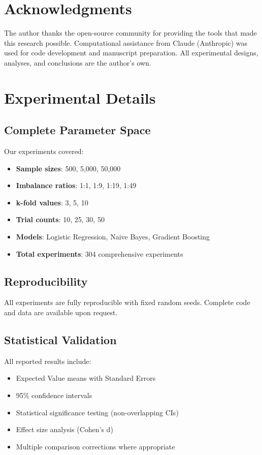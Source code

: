 \documentclass[twoside,11pt]{article}
\begin{document}
\section*{Acknowledgments}

The author thanks the open-source community for providing the tools that made this research possible. Computational assistance from Claude (Anthropic) was used for code development and manuscript preparation. All experimental designs, analyses, and conclusions are the author's own.




\appendix

\section{Experimental Details}

\subsection{Complete Parameter Space}
Our experiments covered:
\begin{itemize}
    \item \textbf{Sample sizes}: 500, 5,000, 50,000
    \item \textbf{Imbalance ratios}: 1:1, 1:9, 1:19, 1:49
    \item \textbf{k-fold values}: 3, 5, 10
    \item \textbf{Trial counts}: 10, 25, 30, 50
    \item \textbf{Models}: Logistic Regression, Naive Bayes, Gradient Boosting
    \item \textbf{Total experiments}: 304 comprehensive experiments
\end{itemize}

\subsection{Reproducibility}
All experiments are fully reproducible with fixed random seeds. Complete code and data are available upon request.

\subsection{Statistical Validation}
All reported results include:
\begin{itemize}
    \item Expected Value means with Standard Errors
    \item 95\% confidence intervals
    \item Statistical significance testing (non-overlapping CIs)
    \item Effect size analysis (Cohen's d)
    \item Multiple comparison corrections where appropriate
\end{itemize}
\end{document}
